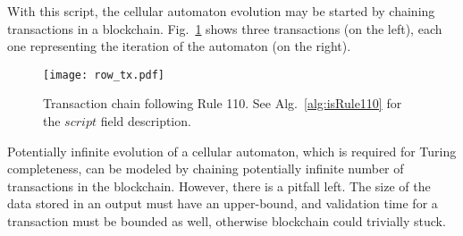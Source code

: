 \documentclass[runningheads]{llncs}
\begin{document}
    With this script, the cellular automaton evolution may be started by
    chaining transactions in a blockchain. Fig.~\ref{fig:txs} shows three
    transactions (on the left), each one representing the iteration of the
    automaton (on the right).

    \begin{figure}[h]
        \centering
        \texttt{[image: row\_tx.pdf]}
        \caption{Transaction chain following Rule 110. See
            Alg.~\ref{alg:isRule110} for the
            $script$ field description.
        \label{fig:txs} }
    \end{figure}

    Potentially infinite evolution of a cellular automaton, which is
    required for Turing completeness, can be modeled by chaining potentially infinite
    number of transactions in the blockchain. However, there is a pitfall left.
    The size of the data stored in an output must have an upper-bound, and validation
    time for a transaction must be bounded as well, otherwise blockchain could trivially stuck.
\end{document}
